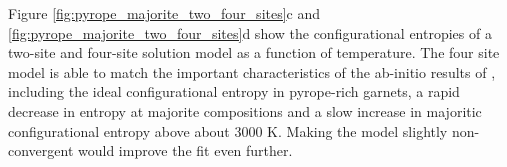 \documentclass[preprint,12pt]{elsarticle}
\begin{document}
Figure \ref{fig:pyrope_majorite_two_four_sites}c and \ref{fig:pyrope_majorite_two_four_sites}d show the configurational entropies of a two-site and four-site solution model as a function of temperature. The four site model is able to match the important characteristics of the ab-initio results of \citet[][shown as black lines in Figure \ref{fig:pyrope_majorite_two_four_sites}a]{Vinograd2006}, including the ideal configurational entropy in pyrope-rich garnets, a rapid decrease in entropy at majorite compositions and a slow increase in majoritic configurational entropy above about 3000 K. Making the model slightly non-convergent would improve the fit even further.

\end{document}
